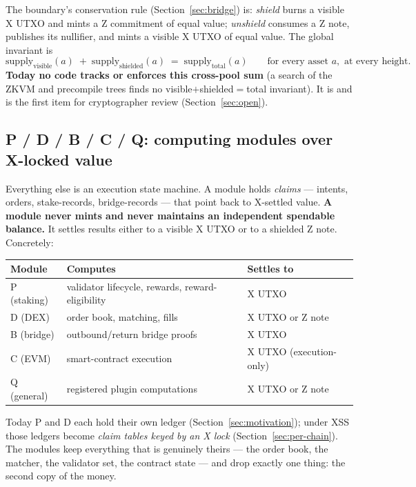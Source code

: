 \noindent The boundary's conservation rule (Section~\ref{sec:bridge})
is: \emph{shield} burns a visible X UTXO and mints a Z commitment of
equal value; \emph{unshield} consumes a Z note, publishes its nullifier,
and mints a visible X UTXO of equal value. The global invariant is
\[
  \mathrm{supply}_{\text{visible}}(a) \;+\;
  \mathrm{supply}_{\text{shielded}}(a) \;=\;
  \mathrm{supply}_{\text{total}}(a)
  \qquad\text{for every asset } a, \text{ at every height.}
\]
\textbf{Today no code tracks or enforces this cross-pool sum} (a search
of the ZKVM and precompile trees finds no visible$+$shielded$=$total
invariant). It is \DESIGN{} and is the first item for cryptographer
review (Section~\ref{sec:open}).

\subsection{P / D / B / C / Q: computing modules over X-locked value}

Everything else is an execution state machine. A module holds
\emph{claims} --- intents, orders, stake-records, bridge-records ---
that point back to X-settled value. \textbf{A module never mints and
never maintains an independent spendable balance.} It settles results
either to a visible X UTXO or to a shielded Z note. Concretely:

\begin{center}
\begin{tabular}{@{}lll@{}}
\toprule
Module & Computes & Settles to \\
\midrule
P (staking)   & validator lifecycle, rewards, reward-eligibility & X UTXO \\
D (DEX)       & order book, matching, fills            & X UTXO or Z note \\
B (bridge)    & outbound/return bridge proofs          & X UTXO \\
C (EVM)       & smart-contract execution               & X UTXO (execution-only) \\
Q (general)   & registered plugin computations         & X UTXO or Z note \\
\bottomrule
\end{tabular}
\end{center}

\noindent Today P and D each hold their own ledger
(Section~\ref{sec:motivation}); under XSS those ledgers become
\emph{claim tables keyed by an X lock} (Section~\ref{sec:per-chain}).
The modules keep everything that is genuinely theirs --- the order book,
the matcher, the validator set, the contract state --- and drop exactly
one thing: the second copy of the money.

